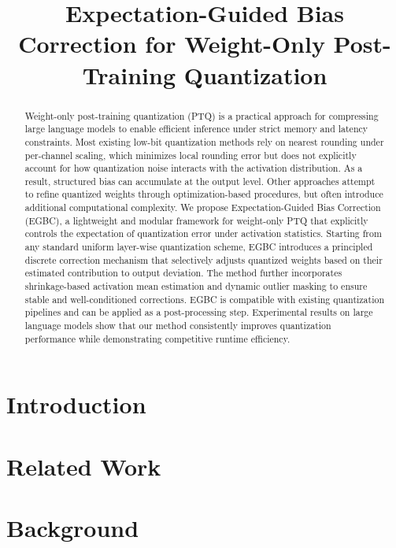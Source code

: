 \documentclass[table, 11pt]{article}
\title{Expectation-Guided Bias Correction for Weight-Only Post-Training Quantization}
\author{
}
\begin{document}
\maketitle
\begin{abstract}

Weight-only post-training quantization (PTQ) is a practical approach for compressing large language models to enable efficient inference under strict memory and latency constraints. Most existing low-bit quantization methods rely on nearest rounding under per-channel scaling, which minimizes local rounding error but does not explicitly account for how quantization noise interacts with the activation distribution. As a result, structured bias can accumulate at the output level. Other approaches attempt to refine quantized weights through optimization-based procedures, but often introduce additional computational complexity. We propose Expectation-Guided Bias Correction (EGBC), a lightweight and modular framework for weight-only PTQ that explicitly controls the expectation of quantization error under activation statistics. Starting from any standard uniform layer-wise quantization scheme, EGBC introduces a principled discrete correction mechanism that selectively adjusts quantized weights based on their estimated contribution to output deviation. The method further incorporates shrinkage-based activation mean estimation and dynamic outlier masking to ensure stable and well-conditioned corrections. EGBC is compatible with existing quantization pipelines and can be applied as a post-processing step. Experimental results on large language models show that our method consistently improves quantization performance while demonstrating competitive runtime efficiency.

\end{abstract}
\section{Introduction}\label{sec:intro}
\section{Related Work}

\section{Background}
\end{document}
